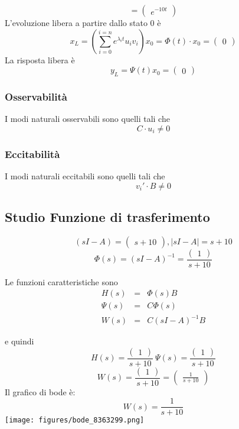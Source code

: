\documentclass{article}
\begin{document}
\[ = \left(\begin{matrix}e^{- 10 t}\end{matrix}\right) \]L'evoluzione libera  a partire dallo stato $ 0 $ è \[ x_L = (\sum_{i=0}^{i=n} e^{\lambda_i t}u_i v_i)x_0=\Phi(t) \cdot x_0 = \left(\begin{matrix}0\end{matrix}\right) \]
La risposta libera è \[ y_L = \Psi(t) x_0 = \left(\begin{matrix}0\end{matrix}\right) \]
\subsubsection{Osservabilità}
 I modi naturali osservabili sono quelli tali che 
\[ C \cdot u_i   \neq 0\]
\subsubsection{Eccitabilità}
 I modi naturali eccitabili sono quelli tali che 
\[v_i' \cdot B \neq 0\]

\subsection{Studio Funzione di trasferimento}

\[ (sI-A) = \left(\begin{matrix}s + 10\end{matrix}\right), |sI-A| = s + 10 \]
\[ \Phi(s) = (sI-A)^{-1} = \frac{\left(\begin{matrix}1\end{matrix}\right)}{s + 10} \]

Le funzioni caratteristiche sono \[\begin{array}{rcl}  H(s) & = & \Phi(s)B \\ \Psi(s) & = & C \Phi(s)\\ W(s) & = & C(sI-A)^{-1}B  \end{array} \]

e quindi \[ H(s)  =  \frac{\left(\begin{matrix}1\end{matrix}\right)}{s + 10} \ \Psi(s) = \frac{\left(\begin{matrix}1\end{matrix}\right)}{s + 10} \]
\[ W(s)  =  \frac{\left(\begin{matrix}1\end{matrix}\right)}{s + 10} = \left(\begin{matrix}\frac{1}{s + 10}\end{matrix}\right)  \] 
Il grafico di bode è:
\[ W(s) = \frac{1}{s + 10} \]\texttt{[image: figures/bode\_8363299.png]}
\end{document}

